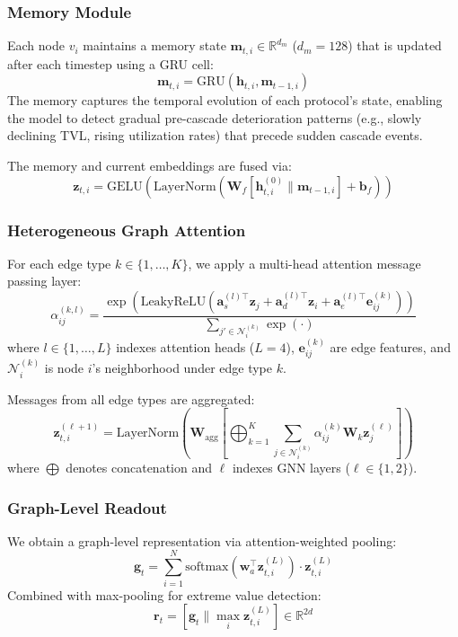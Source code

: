 \documentclass[journal]{IEEEtran}
\begin{document}
\subsubsection{Memory Module}
Each node $v_i$ maintains a memory state $\mathbf{m}_{t,i} \in \mathbb{R}^{d_m}$ ($d_m = 128$) that is updated after each timestep using a GRU cell:
\begin{equation}
    \mathbf{m}_{t,i} = \text{GRU}\left(\mathbf{h}_{t,i}, \mathbf{m}_{t-1,i}\right)
\end{equation}
The memory captures the temporal evolution of each protocol's state, enabling the model to detect gradual pre-cascade deterioration patterns (e.g., slowly declining TVL, rising utilization rates) that precede sudden cascade events.

The memory and current embeddings are fused via:
\begin{equation}
    \mathbf{z}_{t,i} = \text{GELU}\left(\text{LayerNorm}\left(\mathbf{W}_f [\mathbf{h}_{t,i}^{(0)} \| \mathbf{m}_{t-1,i}] + \mathbf{b}_f\right)\right)
\end{equation}

\subsubsection{Heterogeneous Graph Attention}
For each edge type $k \in \{1, \ldots, K\}$, we apply a multi-head attention message passing layer:
\begin{equation}
    \alpha_{ij}^{(k,l)} = \frac{\exp\left(\text{LeakyReLU}\left(\mathbf{a}_s^{(l)\top}\mathbf{z}_j + \mathbf{a}_d^{(l)\top}\mathbf{z}_i + \mathbf{a}_e^{(l)\top}\mathbf{e}_{ij}^{(k)}\right)\right)}{\sum_{j' \in \mathcal{N}_i^{(k)}} \exp(\cdot)}
\end{equation}
where $l \in \{1, \ldots, L\}$ indexes attention heads ($L = 4$), $\mathbf{e}_{ij}^{(k)}$ are edge features, and $\mathcal{N}_i^{(k)}$ is node $i$'s neighborhood under edge type $k$.

Messages from all edge types are aggregated:
\begin{equation}
    \mathbf{z}_{t,i}^{(\ell+1)} = \text{LayerNorm}\left(\mathbf{W}_{\text{agg}} \left[\bigoplus_{k=1}^K \sum_{j \in \mathcal{N}_i^{(k)}} \alpha_{ij}^{(k)} \mathbf{W}_k \mathbf{z}_j^{(\ell)}\right]\right)
\end{equation}
where $\bigoplus$ denotes concatenation and $\ell$ indexes GNN layers ($\ell \in \{1, 2\}$).

\subsubsection{Graph-Level Readout}
We obtain a graph-level representation via attention-weighted pooling:
\begin{equation}
    \mathbf{g}_t = \sum_{i=1}^N \text{softmax}\left(\mathbf{w}_a^\top \mathbf{z}_{t,i}^{(L)}\right) \cdot \mathbf{z}_{t,i}^{(L)}
\end{equation}
Combined with max-pooling for extreme value detection:
\begin{equation}
    \mathbf{r}_t = [\mathbf{g}_t \| \max_i \mathbf{z}_{t,i}^{(L)}] \in \mathbb{R}^{2d}
\end{equation}
\end{document}
